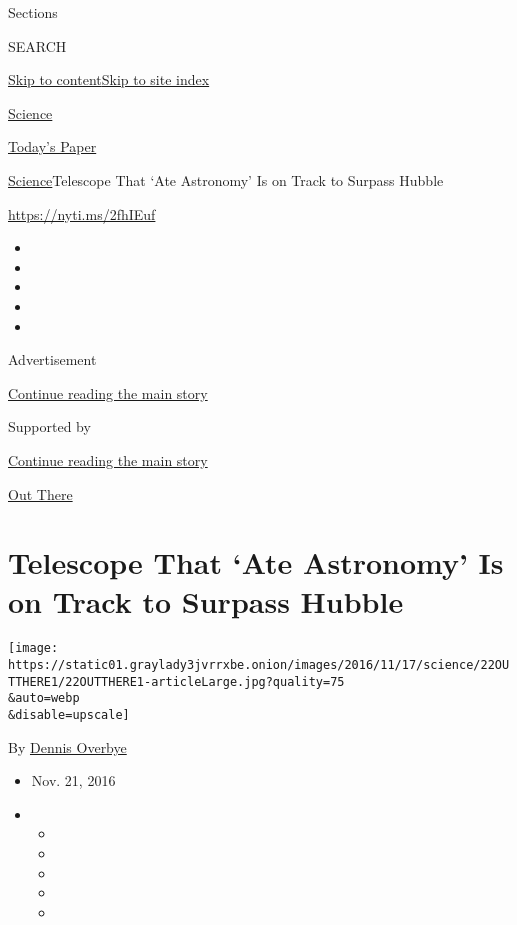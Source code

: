 Sections

SEARCH

\protect\hyperlink{site-content}{Skip to
content}\protect\hyperlink{site-index}{Skip to site index}

\href{https://www.nytimes3xbfgragh.onion/section/science}{Science}

\href{https://myaccount.nytimes3xbfgragh.onion/auth/login?response_type=cookie\&client_id=vi}{}

\href{https://www.nytimes3xbfgragh.onion/section/todayspaper}{Today's
Paper}

\href{/section/science}{Science}\textbar{}Telescope That `Ate Astronomy'
Is on Track to Surpass Hubble

\url{https://nyti.ms/2fhIEuf}

\begin{itemize}
\item
\item
\item
\item
\item
\end{itemize}

Advertisement

\protect\hyperlink{after-top}{Continue reading the main story}

Supported by

\protect\hyperlink{after-sponsor}{Continue reading the main story}

\href{/column/out-there}{Out There}

\hypertarget{telescope-that-ate-astronomy-is-on-track-to-surpass-hubble}{%
\section{Telescope That `Ate Astronomy' Is on Track to Surpass
Hubble}\label{telescope-that-ate-astronomy-is-on-track-to-surpass-hubble}}

\texttt{[image: https://static01.graylady3jvrrxbe.onion/images/2016/11/17/science/22OUTTHERE1/22OUTTHERE1-articleLarge.jpg?quality=75\\\&auto=webp\\\&disable=upscale]}

By \href{http://www.nytimes3xbfgragh.onion/by/dennis-overbye}{Dennis
Overbye}

\begin{itemize}
\item
  Nov. 21, 2016
\item
  \begin{itemize}
  \item
  \item
  \item
  \item
  \item
  \end{itemize}
\end{itemize}

